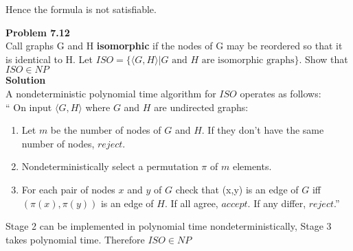 \documentclass{article}
\newcommand\curl[1]{\{#1\}}
\newcommand{\problem}[1]{\large{\textbf{Problem #1}}\\}
\begin{document}
    Hence the formula is not satisfiable.

\pagebreak

\problem{7.12}
Call graphs G and H \textbf{isomorphic} if the nodes of G may be reordered so that it is identical to H. 
Let $ISO = \curl{\langle G, H \rangle | G \text{ and } H \text{ are isomorphic graphs}}$. Show that
$ISO \in NP$ \\

\textbf{Solution}\\

A nondeterministic polynomial time algorithm for $ISO$ operates as follows:\\
`` On input $\langle G, H \rangle$ where $G$ and $H$ are undirected graphs:
    \begin{enumerate}[1., leftmargin = 0.6cm]
    \itemsep0em
    \item  Let $m$ be the number of nodes of $G$ and $H$. If they don't have the same number of nodes, $reject$.
    \item Nondeterministically select a permutation $\pi$ of $m$ elements.
    \item For each pair of nodes $x$ and $y$ of $G$ check that (x,y) is an edge of $G$ iff $(\pi(x), \pi(y))$
        is an edge of $H$. If all agree, $accept$. If any differ, $reject$.''
    \end{enumerate}

    Stage 2 can be implemented in polynomial time nondeterministically, Stage 3 takes polynomial time.
    Therefore $ISO \in NP$
 
\end{document}
